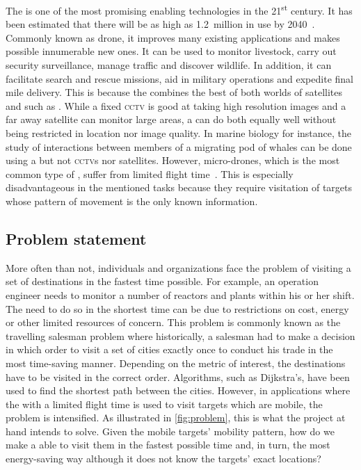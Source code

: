 \documentclass[../main.tex]{subfiles}
\begin{document}
The \uav is one of the most promising enabling technologies in the 
21\textsuperscript{st} century. It has been estimated that
there will be as high as \SI{1.2}{million} \uavs in use 
by 2040~\cite{Amo19}. 
Commonly known as drone, 
it improves many existing applications and makes possible 
innumerable new ones. It can be used to monitor livestock, 
carry out security surveillance, manage traffic 
and discover wildlife.
In addition, it can facilitate search and rescue missions,
aid in military operations and expedite final mile delivery.
This is because the \uav combines the best of both worlds
of satellites and \csns such as \cctvs.
While a fixed \textsc{cctv} is good at taking 
high resolution images and a far away satellite can monitor
large areas, a \uav can do both equally well without 
being restricted in location nor image quality. 
In marine biology for instance,  
the study of interactions between members of a migrating 
pod of whales can be done using a \uav but not 
\textsc{cctv}s nor satellites.
However, micro-drones, which is the most common type of \uavs,
suffer from limited flight time~\cite{Sha19}. 
This is especially disadvantageous in
the mentioned tasks because they require visitation of targets
whose pattern of movement is the only known information.

\subsection{Problem statement}

More often than not, individuals and organizations face the problem
of visiting a set of destinations in the fastest time 
possible.
For example, an operation engineer needs to monitor
a number of reactors and plants within his or her shift.
The need to do so in the shortest time can be due to restrictions on
cost, energy or other limited resources of concern.
This problem is commonly known as the travelling salesman problem
where historically, a salesman had to make a decision in which order
to visit a set of cities exactly once to conduct his trade
in the most time-saving manner.
Depending on the metric of interest, 
the destinations have to be visited in the correct order.
Algorithms, such as Dijkstra's, have been used 
to find the shortest path between the cities.
However, in applications where the \uav with a limited
flight time is used to 
visit targets which are mobile, the problem is intensified.
As illustrated in \cref{fig:problem}, this
is what the project at hand intends to solve.
Given the mobile targets' mobility pattern,
how do we make a \uav able to visit them
in the fastest possible time and, in turn, 
the most energy-saving way although it does not know the targets'
exact locations?  
\end{document}

